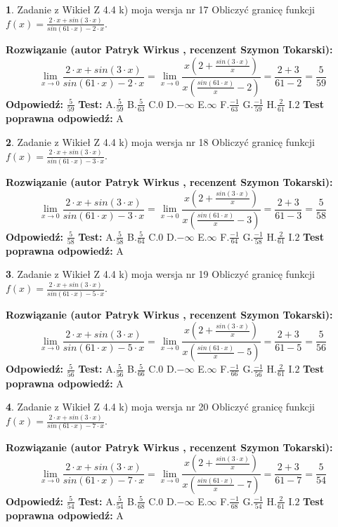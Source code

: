 \documentclass[12pt, a4paper]{article}
\theoremstyle{definition} %
\newtheorem{zad}{}
\newcommand{\zadStart}[1]{\begin{zad}#1\newline}
\newcommand{\zadStop}{\end{zad}}
\newcommand{\rozwStart}[2]{\noindent \textbf{Rozwiązanie (autor #1 , recenzent #2): }\newline}
\newcommand{\rozwStop}{\newline}
\newcommand{\odpStart}{\noindent \textbf{Odpowiedź:}\newline}
\newcommand{\odpStop}{\newline}
\newcommand{\testStart}{\noindent \textbf{Test:}\newline}
\newcommand{\testStop}{\newline}
\newcommand{\kluczStart}{\noindent \textbf{Test poprawna odpowiedź:}\newline}
\newcommand{\kluczStop}{\newline}
\begin{document}
\zadStart{Zadanie z Wikieł Z 4.4 k) moja wersja nr 17}
Obliczyć granicę funkcji $f(x)=\frac{2\cdot x +sin(3\cdot x)}{sin(61\cdot x) -2\cdot x}$.
\zadStop
\rozwStart{Patryk Wirkus}{Szymon Tokarski}
$$\lim\limits_{x\to 0}\frac{2\cdot x +sin(3\cdot x)}{sin(61\cdot x) -2\cdot x}
=\lim\limits_{x\to 0}\frac{x(2+\frac{sin(3\cdot x)}{x})}{x(\frac{sin(61\cdot x)}{x}-2)}
=\frac{2+3}{61-2} = \frac{5}{59}$$
\rozwStop
\odpStart
$\frac{5}{59}$
\odpStop
\testStart
A.$\frac{5}{59}$
B.$\frac{5}{63}$
C.$0$
D.$-\infty$
E.$\infty$
F.$\frac{-1}{63}$
G.$\frac{-1}{59}$
H.$\frac{2}{61}$
I.$2$
\testStop
\kluczStart
A
\kluczStop



\zadStart{Zadanie z Wikieł Z 4.4 k) moja wersja nr 18}
Obliczyć granicę funkcji $f(x)=\frac{2\cdot x +sin(3\cdot x)}{sin(61\cdot x) -3\cdot x}$.
\zadStop
\rozwStart{Patryk Wirkus}{Szymon Tokarski}
$$\lim\limits_{x\to 0}\frac{2\cdot x +sin(3\cdot x)}{sin(61\cdot x) -3\cdot x}
=\lim\limits_{x\to 0}\frac{x(2+\frac{sin(3\cdot x)}{x})}{x(\frac{sin(61\cdot x)}{x}-3)}
=\frac{2+3}{61-3} = \frac{5}{58}$$
\rozwStop
\odpStart
$\frac{5}{58}$
\odpStop
\testStart
A.$\frac{5}{58}$
B.$\frac{5}{64}$
C.$0$
D.$-\infty$
E.$\infty$
F.$\frac{-1}{64}$
G.$\frac{-1}{58}$
H.$\frac{2}{61}$
I.$2$
\testStop
\kluczStart
A
\kluczStop



\zadStart{Zadanie z Wikieł Z 4.4 k) moja wersja nr 19}
Obliczyć granicę funkcji $f(x)=\frac{2\cdot x +sin(3\cdot x)}{sin(61\cdot x) -5\cdot x}$.
\zadStop
\rozwStart{Patryk Wirkus}{Szymon Tokarski}
$$\lim\limits_{x\to 0}\frac{2\cdot x +sin(3\cdot x)}{sin(61\cdot x) -5\cdot x}
=\lim\limits_{x\to 0}\frac{x(2+\frac{sin(3\cdot x)}{x})}{x(\frac{sin(61\cdot x)}{x}-5)}
=\frac{2+3}{61-5} = \frac{5}{56}$$
\rozwStop
\odpStart
$\frac{5}{56}$
\odpStop
\testStart
A.$\frac{5}{56}$
B.$\frac{5}{66}$
C.$0$
D.$-\infty$
E.$\infty$
F.$\frac{-1}{66}$
G.$\frac{-1}{56}$
H.$\frac{2}{61}$
I.$2$
\testStop
\kluczStart
A
\kluczStop



\zadStart{Zadanie z Wikieł Z 4.4 k) moja wersja nr 20}
Obliczyć granicę funkcji $f(x)=\frac{2\cdot x +sin(3\cdot x)}{sin(61\cdot x) -7\cdot x}$.
\zadStop
\rozwStart{Patryk Wirkus}{Szymon Tokarski}
$$\lim\limits_{x\to 0}\frac{2\cdot x +sin(3\cdot x)}{sin(61\cdot x) -7\cdot x}
=\lim\limits_{x\to 0}\frac{x(2+\frac{sin(3\cdot x)}{x})}{x(\frac{sin(61\cdot x)}{x}-7)}
=\frac{2+3}{61-7} = \frac{5}{54}$$
\rozwStop
\odpStart
$\frac{5}{54}$
\odpStop
\testStart
A.$\frac{5}{54}$
B.$\frac{5}{68}$
C.$0$
D.$-\infty$
E.$\infty$
F.$\frac{-1}{68}$
G.$\frac{-1}{54}$
H.$\frac{2}{61}$
I.$2$
\testStop
\kluczStart
A
\kluczStop
\end{document}
